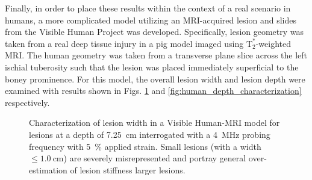 			Finally, in order to place these results within the context of a real scenario in humans, a more complicated model utilizing an MRI-acquired lesion and slides from the Visible Human Project \cite{visiblehuman} was developed. Specifically, lesion geometry was taken from a real deep tissue injury in a pig model imaged using $\mathrm{T}_2^*$-weighted MRI. The human geometry was taken from a transverse plane slice across the left ischial tuberosity such that the lesion was placed immediately superficial to the boney prominence. For this model, the overall lesion width and lesion depth were examined with results shown in Figs. \ref{fig:human_size_characterization} and \ref{fig:human_depth_characterization} respectively.

			\begin{figure}[!htb]
				\centering
				\caption[Quasi-static Visible Human model lesion width characterization]{Characterization of lesion width in a Visible Human-MRI model for lesions at a depth of \SI{7.25}{\cm} interrogated with a \SI{4}{\MHz} probing frequency with \SI{5}{\percent} applied strain. Small lesions (with a width $\leq \SI{1.0}{\cm}$) are severely misrepresented and portray general over-estimation of lesion stiffness larger lesions.}
				\label{fig:human_size_characterization}
			\end{figure}

